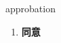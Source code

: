 
\begin{frame}
{\huge approbation}
\begin{center}
\begin{enumerate}\Large
  \item \textbf{同意}
\end{enumerate}
\end{center}
\end{frame}
